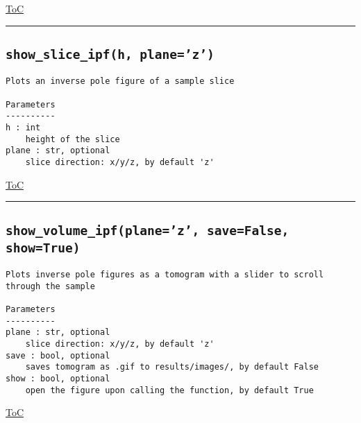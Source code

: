 \documentclass{article}
\begin{document}
\begin{flushright}

\hyperref[toc]{ToC}

\end{flushright}



\vspace{5mm}

\hrule

\subsection*{\texttt{show\_slice\_ipf(h, plane='z')}}

\begin{lstlisting}[language=docstring]
Plots an inverse pole figure of a sample slice

Parameters
----------
h : int
    height of the slice
plane : str, optional
    slice direction: x/y/z, by default 'z'
\end{lstlisting}

\begin{flushright}

\hyperref[toc]{ToC}

\end{flushright}



\vspace{5mm}

\hrule

\subsection*{\texttt{show\_volume\_ipf(plane='z', save=False, show=True)}}

\begin{lstlisting}[language=docstring]
Plots inverse pole figures as a tomogram with a slider to scroll through the sample

Parameters
----------
plane : str, optional
    slice direction: x/y/z, by default 'z'
save : bool, optional
    saves tomogram as .gif to results/images/, by default False
show : bool, optional
    open the figure upon calling the function, by default True
\end{lstlisting}

\begin{flushright}

\hyperref[toc]{ToC}

\end{flushright}
\end{document}

